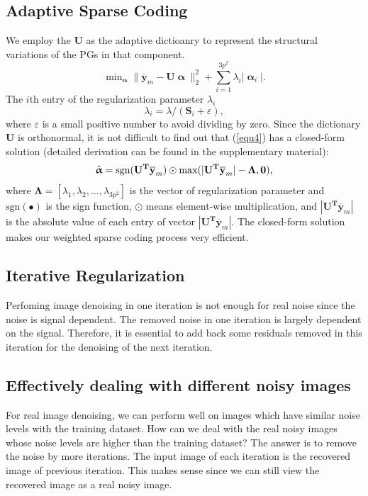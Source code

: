 \documentclass[10pt,twocolumn,letterpaper]{article}
\begin{document}
\subsection{Adaptive Sparse Coding}
We employ the $\mathbf{U}$ as the adaptive dictioanry to represent the structural variations of the PGs in that component.
\begin{equation}\label{equ5}
\min\nolimits_{\boldsymbol{\upalpha}}\|\mathbf{\overline{y}}_{m}-\mathbf{U}\boldsymbol{\upalpha}\|_{2}^{2}+\sum_{i=1}^{3p^{2}}\lambda_{i}|\boldsymbol{\upalpha}_{i}|.
\end{equation}
The $i$th entry of the regularization parameter $\lambda_{i}$ 
\begin{equation}\label{equ6}
\lambda_{i} = \lambda/(\mathbf{S}_{i}+\varepsilon),
\end{equation}
where $\varepsilon$ is a small positive number to avoid dividing by zero. Since the dictionary $\mathbf{U}$ is orthonormal, it is not difficult to find out that (\ref{equ4}) has a closed-form solution (detailed derivation can be found in the supplementary material):
\begin{equation}\label{equ7}
\setlength{\abovedisplayskip}{3pt}
\setlength{\belowdisplayskip}{4pt}
\hat{\boldsymbol{\upalpha}}= \text{sgn}(\mathbf{U^{T}\overline{y}}_{m})\odot \text{max}(|\mathbf{U^{T}\overline{y}}_{m}|-\mathbf{\Lambda},\mathbf{0}),
\end{equation}
where $\mathbf{\Lambda} = [\lambda_{1},\lambda_{2},...,\lambda_{3p^2}]$ is the vector of regularization parameter and $\text{sgn}(\bullet)$ is the sign function, $\odot$ means element-wise multiplication, and $|\mathbf{U^{T}\overline{y}}_{m}|$ is the absolute value of each entry of vector $|\mathbf{U^{T}\overline{y}}_{m}|$. The closed-form solution makes our weighted sparse coding process very efficient. 

\subsection{Iterative Regularization}
Perfoming image denoising in one iteration is not enough for real noise since the noise is signal dependent. The removed noise in one iteration is largely dependent on the signal. Therefore, it is essential to add back some residuals removed in this iteration for the denoising of the next iteration. 

\subsection{Effectively dealing with different noisy images}
For real image denoising, we can perform well on images which have similar noise levels with the training dataset. How can we deal with the real noisy images whose noise levels are higher than the training dataset? The answer is to remove the noise by more iterations. The input image of each iteration is the recovered image of previous iteration. This makes sense since we can still view the recovered image as a real noisy image. 
\end{document}

